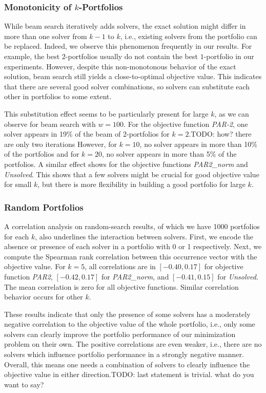 \documentclass[conference]{IEEEtran}
\newcommand{\todo}[1]{{\color{red}TODO: #1}}
\begin{document}
\subsubsection{Monotonicity of $k$-Portfolios}

While beam search iteratively adds solvers, the exact solution might differ in more than one solver from $k-1$ to $k$, i.e., existing solvers from the portfolio can be replaced.
Indeed, we observe this phenomenon frequently in our results.
For example, the best $2$-portfolios usually do not contain the best $1$-portfolio in our experiments.
However, despite this non-monotonous behavior of the exact solution, beam search still yields a close-to-optimal objective value.
This indicates that there are several good solver combinations, so solvers can substitute each other in portfolios to some extent.

This substitution effect seems to be particularly present for large $k$, as we can observe for beam search with $w=100$. 
For the objective function \emph{PAR-2}, one solver appears in 19\% of the beam of $2$-portfolios for $k=2$.\todo{how? there are only two iterations}
However, for $k=10$, no solver appears in more than 10\% of the portfolios and for $k=20$, no solver appears in more than 5\% of the portfolios.
A similar effect shows for the objective functions \emph{PAR2\_norm} and \emph{Unsolved}.
This shows that a few solvers might be crucial for good objective value for small $k$, but there is more flexibility in building a good portfolio for large $k$.


\subsubsection{Random Portfolios}

A correlation analysis on random-search results, of which we have 1000 portfolios for each $k$, also underlines the interaction between solvers.
First, we encode the absence or presence of each solver in a portfolio with 0 or 1 respectively.
Next, we compute the Spearman rank correlation between this occurrence vector with the objective value.
For $k=5$, all correlations are in $[-0.40,0.17]$ for objective function \emph{PAR2}, $[-0.42,0.17]$ for \emph{PAR2\_norm}, and $[-0.41,0.15]$ for \emph{Unsolved}.
The mean correlation is zero for all objective functions.
Similar correlation behavior occurs for other $k$.

These results indicate that only the presence of some solvers has a moderately negative correlation to the objective value of the whole portfolio, i.e., only some solvers can clearly improve the portfolio performance of our minimization problem on their own.
The positive correlations are even weaker, i.e., there are no solvers which influence portfolio performance in a strongly negative manner.
Overall, this means one needs a combination of solvers to clearly influence the objective value in either direction.\todo{last statement is trivial. what do you want to say?}
\end{document}

